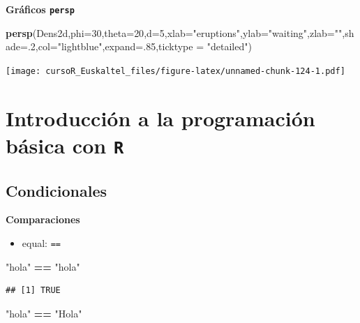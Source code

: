 \documentclass[]{book}
\newenvironment{Shaded}{\begin{snugshade}}{\end{snugshade}}
\newcommand{\KeywordTok}[1]{\textcolor[rgb]{0.13,0.29,0.53}{\textbf{#1}}}
\newcommand{\DataTypeTok}[1]{\textcolor[rgb]{0.13,0.29,0.53}{#1}}
\newcommand{\DecValTok}[1]{\textcolor[rgb]{0.00,0.00,0.81}{#1}}
\newcommand{\StringTok}[1]{\textcolor[rgb]{0.31,0.60,0.02}{#1}}
\newcommand{\OperatorTok}[1]{\textcolor[rgb]{0.81,0.36,0.00}{\textbf{#1}}}
\newcommand{\NormalTok}[1]{#1}
\providecommand{\tightlist}{%
  \setlength{\itemsep}{0pt}\setlength{\parskip}{0pt}}
\begin{document}
\textbf{Gráficos \texttt{persp}}

\begin{Shaded}
\begin{Highlighting}[]
\KeywordTok{persp}\NormalTok{(Dens2d,}\DataTypeTok{phi=}\DecValTok{30}\NormalTok{,}\DataTypeTok{theta=}\DecValTok{20}\NormalTok{,}\DataTypeTok{d=}\DecValTok{5}\NormalTok{,}\DataTypeTok{xlab=}\StringTok{"eruptions"}\NormalTok{,}\DataTypeTok{ylab=}\StringTok{"waiting"}\NormalTok{,}\DataTypeTok{zlab=}\StringTok{""}\NormalTok{,}\DataTypeTok{shade=}\NormalTok{.}\DecValTok{2}\NormalTok{,}\DataTypeTok{col=}\StringTok{"lightblue"}\NormalTok{,}\DataTypeTok{expand=}\NormalTok{.}\DecValTok{85}\NormalTok{,}\DataTypeTok{ticktype =} \StringTok{"detailed"}\NormalTok{)}
\end{Highlighting}
\end{Shaded}

\texttt{[image: cursoR\_Euskaltel\_files/figure-latex/unnamed-chunk-124-1.pdf]}

\chapter{\texorpdfstring{Introducción a la programación básica con
\texttt{R}}{Introducción a la programación básica con R}}\label{introduccion-a-la-programacion-basica-con-r}

\section{Condicionales}\label{condicionales}

\textbf{Comparaciones}

\begin{itemize}
\tightlist
\item
  equal: \texttt{==}
\end{itemize}

\begin{Shaded}
\begin{Highlighting}[]
  \StringTok{"hola"} \OperatorTok{==}\StringTok{ "hola"}
\end{Highlighting}
\end{Shaded}

\begin{verbatim}
## [1] TRUE
\end{verbatim}

\begin{Shaded}
\begin{Highlighting}[]
  \StringTok{"hola"} \OperatorTok{==}\StringTok{ "Hola"}
\end{Highlighting}
\end{Shaded}
\end{document}
